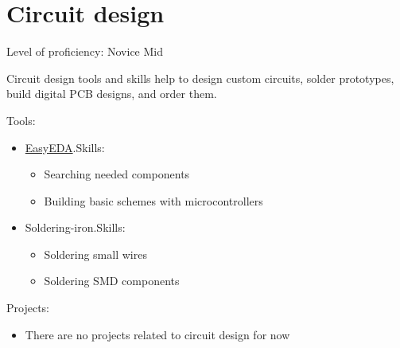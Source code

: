 \section{Circuit design}

Level of proficiency: Novice Mid

\vintent

Circuit design tools and skills help to design custom circuits,
solder prototypes, build digital PCB designs, and order them.

\vintent

Tools:
\begin{itemize}
    \item \href{https://github.com/dkushche/EasyEDA}{EasyEDA}.\break Skills:
    \begin{itemize}
        \item Searching needed components
        \item Building basic schemes with microcontrollers
    \end{itemize}
    \item Soldering-iron.\break Skills:
    \begin{itemize}
        \item Soldering small wires
        \item Soldering SMD components
    \end{itemize}
\end{itemize}

\vintent

Projects:
\begin{itemize}
    \item There are no projects related to circuit design for now
\end{itemize}
